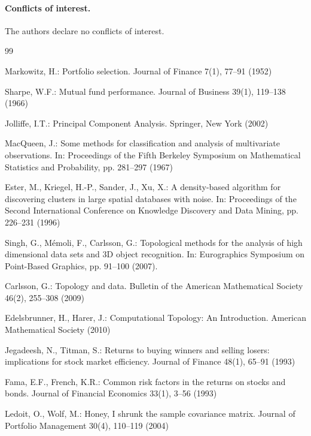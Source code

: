 \documentclass[runningheads]{llncs}
\begin{document}
\paragraph{Conflicts of interest.} The authors declare no conflicts of interest.

\begin{thebibliography}{99}

Markowitz, H.: Portfolio selection. Journal of Finance 7(1), 77--91 (1952)

Sharpe, W.F.: Mutual fund performance. Journal of Business 39(1), 119--138 (1966)

Jolliffe, I.T.: Principal Component Analysis. Springer, New York (2002)

MacQueen, J.: Some methods for classification and analysis of multivariate observations. In: Proceedings of the Fifth Berkeley Symposium on Mathematical Statistics and Probability, pp. 281--297 (1967)

Ester, M., Kriegel, H.-P., Sander, J., Xu, X.: A density-based algorithm for discovering clusters in large spatial databases with noise. In: Proceedings of the Second International Conference on Knowledge Discovery and Data Mining, pp. 226--231 (1996)

Singh, G., M\'emoli, F., Carlsson, G.: Topological methods for the analysis of high dimensional data sets and 3D object recognition. In: Eurographics Symposium on Point-Based Graphics, pp. 91--100 (2007). 

Carlsson, G.: Topology and data. Bulletin of the American Mathematical Society 46(2), 255--308 (2009)

Edelsbrunner, H., Harer, J.: Computational Topology: An Introduction. American Mathematical Society (2010)

Jegadeesh, N., Titman, S.: Returns to buying winners and selling losers: implications for stock market efficiency. Journal of Finance 48(1), 65--91 (1993)

Fama, E.F., French, K.R.: Common risk factors in the returns on stocks and bonds. Journal of Financial Economics 33(1), 3--56 (1993)

Ledoit, O., Wolf, M.: Honey, I shrunk the sample covariance matrix. Journal of Portfolio Management 30(4), 110--119 (2004)


\end{thebibliography}
\end{document}
